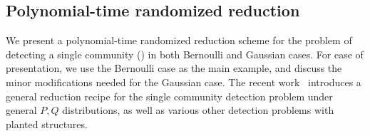 
	



	
	
	\fi 


	\subsection{Polynomial-time randomized reduction}
	\label{sec:comp-pds}
	
	
We present a polynomial-time randomized reduction scheme for the problem of detecting a single community ()
in both Bernoulli and Gaussian cases. For ease of
presentation, we use the Bernoulli case as the main example, and discuss the minor 
modifications needed for the Gaussian case. The recent work~\cite{Brennan18} introduces a general reduction recipe for 
the single community detection problem under general $P, Q$ distributions, as well as various 
other detection problems with planted structures. 


